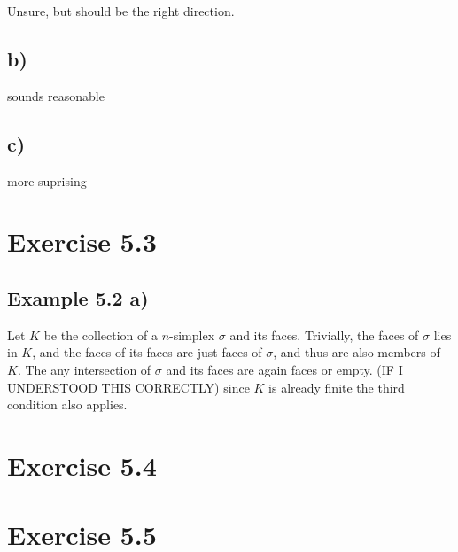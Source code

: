 \documentclass[a4paper]{book}
\theoremstyle{definition}
\begin{document}
Unsure, but should be the right direction.

\subsection*{b)}

sounds reasonable

\subsection*{c)}

more suprising

\section*{Exercise 5.3}

\subsection*{Example 5.2 a)}

Let \(K\) be the collection of a \(n\)-simplex \(\sigma\) and its faces. Trivially, the faces of \(\sigma\) lies in \(K\), and the faces of its faces are just faces of \(\sigma\), and thus are also members of \(K\). The any intersection of \(\sigma\) and its faces are again faces or empty. (IF I UNDERSTOOD THIS CORRECTLY) since \(K\) is already finite the third condition also applies.

\section*{Exercise 5.4}

\section*{Exercise 5.5}
\end{document}
